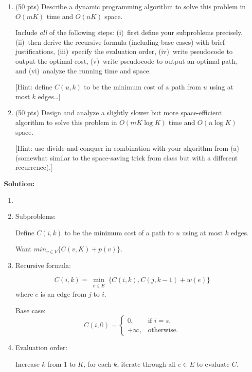 \documentclass[11pt]{article}
\begin{document}
\begin{description}
\begin{enumerate}
\item[(a)] (50 pts) Describe a dynamic programming algorithm to solve this problem
in $O(mK)$ time and $O(nK)$ space.

Include \emph{all} of 
the following steps: (i)~first define your subproblems precisely, 
(ii)~then derive the recursive formula (including base cases) with brief justifications,
(iii)~specify the evaluation order,
(iv)~write pseudocode to output the optimal cost,
(v)~write pseudocode to output an optimal path,  
and (vi)~analyze the running time and space.

[Hint: define $C(u,k)$ to be the minimum cost of a path from $u$ using at most $k$ edges\ldots]

\medskip
\item[(b)] (50 pts) Design and analyze a slightly slower but more space-efficient algorithm to solve this problem
in $O(mK\log K)$ time and $O(n\log K)$ space.

[Hint: use divide-and-conquer in combination with your algorithm from (a) (somewhat similar to the space-saving trick from class but with a different recurrence).]
\end{enumerate}

\textbf{Solution:}

\begin{enumerate}
  \item[\textbf{(a)}] ~
  \item[(i)] Subproblems:

  Define $C(i,k)$ to be the minimum cost of a path to $u$ using at most $k$ edges.

  Want $min_{v \in V}\{C(v,K)+p(v)\}$.

  \item[(ii)] Recursive formula:
  
  \[
  C(i,k) = \min_{\substack{e\in E}}\{C(i,k), C(j,k-1)+w(e)\}
  \]
  where $e$ is an edge from $j$ to $i$.

  Base case: 
  \[C(i, 0)=
  \begin{cases}
    0, &\text{if } i=s,\\
    +\infty, &\text{otherwise.}
  \end{cases}
  \]

  \item[(iii)] Evaluation order:
  
  Increase $k$ from 1 to $K$, for each $k$, iterate through all $e\in E$ to evaluate $C$.


\end{enumerate}
\end{description}
\end{document}
